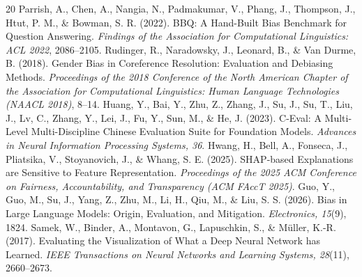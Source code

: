 \documentclass[11pt,a4paper]{article}
\begin{document}
\begin{thebibliography}{20}
 Parrish, A., Chen, A., Nangia, N., Padmakumar, V., Phang, J., Thompson, J., Htut, P. M., \& Bowman, S. R. (2022). BBQ: A Hand-Built Bias Benchmark for Question Answering. \textit{Findings of the Association for Computational Linguistics: ACL 2022}, 2086--2105.
 Rudinger, R., Naradowsky, J., Leonard, B., \& Van Durme, B. (2018). Gender Bias in Coreference Resolution: Evaluation and Debiasing Methods. \textit{Proceedings of the 2018 Conference of the North American Chapter of the Association for Computational Linguistics: Human Language Technologies (NAACL 2018)}, 8--14.
 Huang, Y., Bai, Y., Zhu, Z., Zhang, J., Su, J., Su, T., Liu, J., Lv, C., Zhang, Y., Lei, J., Fu, Y., Sun, M., \& He, J. (2023). C-Eval: A Multi-Level Multi-Discipline Chinese Evaluation Suite for Foundation Models. \textit{Advances in Neural Information Processing Systems, 36}.
 Hwang, H., Bell, A., Fonseca, J., Pliatsika, V., Stoyanovich, J., \& Whang, S. E. (2025). SHAP-based Explanations are Sensitive to Feature Representation. \textit{Proceedings of the 2025 ACM Conference on Fairness, Accountability, and Transparency (ACM FAccT 2025)}.
 Guo, Y., Guo, M., Su, J., Yang, Z., Zhu, M., Li, H., Qiu, M., \& Liu, S. S. (2026). Bias in Large Language Models: Origin, Evaluation, and Mitigation. \textit{Electronics, 15}(9), 1824.
 Samek, W., Binder, A., Montavon, G., Lapuschkin, S., \& M\"{u}ller, K.-R. (2017). Evaluating the Visualization of What a Deep Neural Network has Learned. \textit{IEEE Transactions on Neural Networks and Learning Systems, 28}(11), 2660--2673.
\end{thebibliography}
\end{document}
